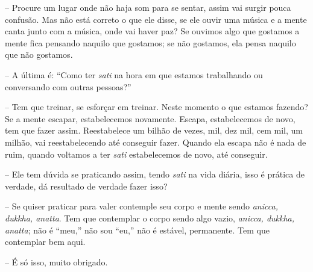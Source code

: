 -- Procure um lugar onde não haja som para se sentar, assim vai
surgir pouca confusão. Mas não está correto o que ele disse, se ele
ouvir uma música e a mente canta junto com a música, onde vai haver
paz? Se ouvimos algo que gostamos a mente fica pensando naquilo que
gostamos; se não gostamos, ela pensa naquilo que não gostamos.

-- A última é: “Como ter \emph{sati} na hora em que estamos
trabalhando ou conversando com outras pessoas?”

-- Tem que treinar, se esforçar em treinar. Neste momento o que
estamos fazendo? Se a mente escapar, estabelecemos novamente. Escapa,
estabelecemos de novo, tem que fazer assim. Reestabelece um bilhão de
vezes, mil, dez mil, cem mil, um milhão, vai reestabelecendo até
conseguir fazer. Quando ela escapa não é nada de ruim, quando voltamos
a ter \emph{sati} estabelecemos de novo, até conseguir.

-- Ele tem dúvida se praticando assim, tendo \emph{sati} na vida
diária, isso é prática de verdade, dá resultado de verdade fazer isso?

-- Se quiser praticar para valer contemple seu corpo e mente sendo
\emph{anicca, dukkha, anatta}. Tem que contemplar o corpo sendo algo
vazio, \emph{anicca, dukkha, anatta}; não é “meu,” não sou “eu,” não
é estável, permanente. Tem que contemplar bem aqui.

-- É só isso, muito obrigado.

